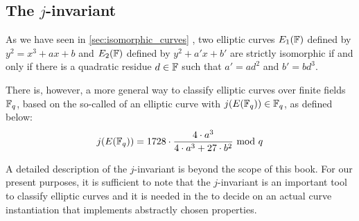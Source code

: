\subsection{The $j$-invariant}
\label{sec:j-inv} As we have seen in \ref{sec:isomorphic_curves} , two elliptic curves $E_1(\mathbb{F})$ defined by $y^2 = x^3 + ax +b$ and $E_2(\mathbb{F})$ defined by $y^2 + a'x + b'$ are strictly isomorphic if and only if there is a quadratic residue $d\in \mathbb{F}$ such that $a' = a d^2$ and $b' = b d^3$. 

There is, however, a more general way to classify elliptic curves over finite fields $\mathbb{F}_q$, based on the so-called  of an elliptic curve with $j(E(\mathbb{F}_q))\in\mathbb{F}_q$, as defined below:
\begin{equation}\label{eq:j-invariant1}
j(E(\mathbb{F}_q)) = 1728\cdot \frac{4\cdot a^3}{4\cdot a^3+ 27\cdot b^2} \text{ mod } q
\end{equation}

A detailed description of the $j$-invariant is beyond the scope of this book. For our present purposes, it is sufficient to note that the $j$-invariant is an important tool to classify elliptic curves and it is needed in the  to decide on an actual curve instantiation that implements abstractly chosen properties.

